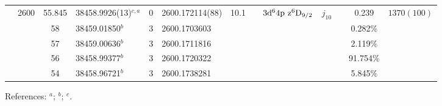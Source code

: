 \begin{table*}
\begin{center}
{\begin{tabular}{:l;l;c;l;c;l;c;l;l;c;c;c;c}
                                  & 2600   & 55.845    & 38458.9926(13)$^{c,a}$           & 0 &   2600.172114(88)  & 10.1 & $                                        $ & $3\rm{d}^64\rm{p~z}^6\rm{D}_{9/2}        $ & $j_{10}$ &              & 0.239     & $ 1370(100)$\\
\rowstyle{\itshape}               &        & 58        & 38459.01850$^{b}$                & 3 &  2600.1703603      &      & $                                        $ & $                                        $ & $      $ &              & 0.282\%   & $          $\\
\rowstyle{\itshape}               &        & 57        & 38459.00636$^{b}$                & 3 &  2600.1711816      &      & $                                        $ & $                                        $ & $      $ &              & 2.119\%   & $          $\\
\rowstyle{\itshape}               &        & 56        & 38458.99377$^{b}$                & 3 &  2600.1720322      &      & $                                        $ & $                                        $ & $      $ &              & 91.754\%  & $          $\\
\rowstyle{\itshape}               &        & 54        & 38458.96721$^{b}$                & 3 &  2600.1738281      &      & $                                        $ & $                                        $ & $      $ &              & 5.845\%   & $          $\\
\hline
\end{tabular}
}
{\footnotesize References:
$^{a}$\citet{Nave:2012:1570};
$^{b}$\citet{Porsev:2009:032519};
$^{c}$\citet{Aldenius:2009:014008}.}
\end{center}
\end{table*}
